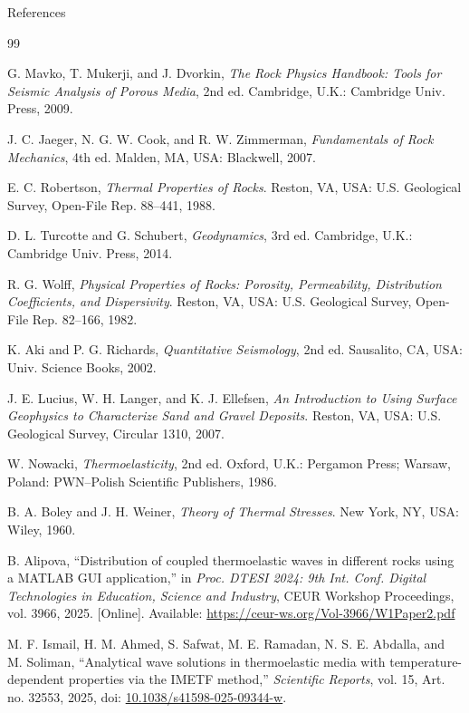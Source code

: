 \documentclass[aspectratio=169,10pt]{beamer}
\begin{document}
\begin{frame}[allowframebreaks]{References}
  \tiny
  \begin{thebibliography}{99}

  G. Mavko, T. Mukerji, and J. Dvorkin,
  \textit{The Rock Physics Handbook: Tools for Seismic Analysis of Porous Media},
  2nd ed. Cambridge, U.K.: Cambridge Univ. Press, 2009.

  J. C. Jaeger, N. G. W. Cook, and R. W. Zimmerman,
  \textit{Fundamentals of Rock Mechanics}, 4th ed.
  Malden, MA, USA: Blackwell, 2007.

  E. C. Robertson,
  \textit{Thermal Properties of Rocks}.
  Reston, VA, USA: U.S. Geological Survey, Open-File Rep. 88--441, 1988.

  D. L. Turcotte and G. Schubert,
  \textit{Geodynamics}, 3rd ed.
  Cambridge, U.K.: Cambridge Univ. Press, 2014.

  R. G. Wolff,
  \textit{Physical Properties of Rocks: Porosity, Permeability, Distribution
  Coefficients, and Dispersivity}.
  Reston, VA, USA: U.S. Geological Survey, Open-File Rep. 82--166, 1982.

  K. Aki and P. G. Richards,
  \textit{Quantitative Seismology}, 2nd ed.
  Sausalito, CA, USA: Univ. Science Books, 2002.

  J. E. Lucius, W. H. Langer, and K. J. Ellefsen,
  \textit{An Introduction to Using Surface Geophysics to Characterize Sand and
  Gravel Deposits}.
  Reston, VA, USA: U.S. Geological Survey, Circular 1310, 2007.

  W. Nowacki,
  \textit{Thermoelasticity}, 2nd ed.
  Oxford, U.K.: Pergamon Press; Warsaw, Poland: PWN--Polish Scientific
  Publishers, 1986.

  B. A. Boley and J. H. Weiner,
  \textit{Theory of Thermal Stresses}.
  New York, NY, USA: Wiley, 1960.

  B. Alipova,
  ``Distribution of coupled thermoelastic waves in different rocks using a
  MATLAB GUI application,''
  in \textit{Proc. DTESI 2024: 9th Int. Conf. Digital Technologies in Education,
  Science and Industry}, CEUR Workshop Proceedings, vol. 3966, 2025.
  [Online]. Available: \url{https://ceur-ws.org/Vol-3966/W1Paper2.pdf}

  M. F. Ismail, H. M. Ahmed, S. Safwat, M. E. Ramadan, N. S. E. Abdalla, and
  M. Soliman,
  ``Analytical wave solutions in thermoelastic media with temperature-dependent
  properties via the IMETF method,''
  \textit{Scientific Reports}, vol. 15, Art. no. 32553, 2025,
  doi: \href{https://doi.org/10.1038/s41598-025-09344-w}
  {10.1038/s41598-025-09344-w}.


\end{thebibliography}
\end{frame}
\end{document}
